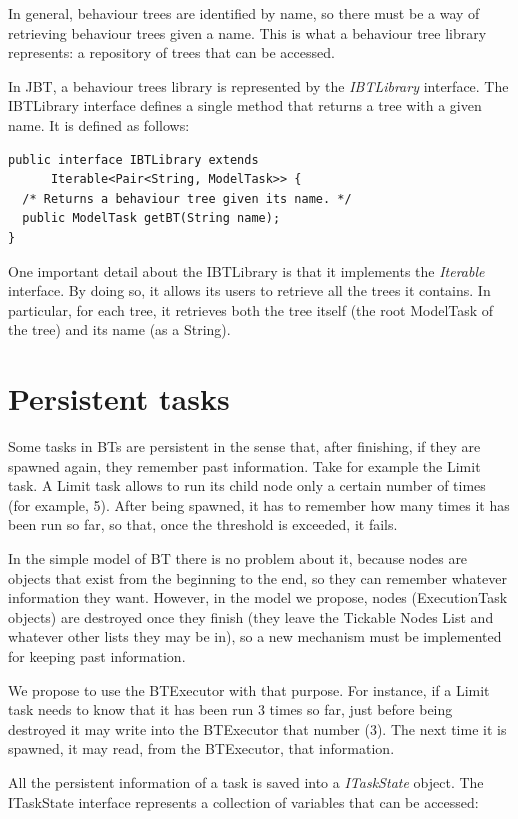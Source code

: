 \documentclass[a4paper,10pt]{article}
\begin{document}
In general, behaviour trees are identified by name, so there must be a way of retrieving behaviour trees given a name. This is what a behaviour tree library represents: a repository of trees that can be accessed.

In JBT, a behaviour trees library is represented by the \textit{IBTLibrary} interface. The IBTLibrary interface defines a single method that returns a tree with a given name. It is defined as follows:

\begin{verbatim}
public interface IBTLibrary extends 
	  Iterable<Pair<String, ModelTask>> {
  /* Returns a behaviour tree given its name. */
  public ModelTask getBT(String name);
}
\end{verbatim}

One important detail about the IBTLibrary is that it implements the \textit{Iterable} interface. By doing so, it allows its users to retrieve all the trees it contains. In particular, for each tree, it retrieves both the tree itself (the root ModelTask of the tree) and its name (as a String).

\section{Persistent tasks}

Some tasks in BTs are persistent in the sense that, after finishing, if they are spawned again, they remember past information. Take for example the Limit task. A Limit task allows to run its child node only a certain number of times (for example, 5). After being spawned, it has to remember how many times it has been run so far, so that, once the threshold is exceeded, it fails.

In the simple model of BT there is no problem about it, because nodes are objects that exist from the beginning to the end, so they can remember whatever information they want. However, in the model we propose, nodes (ExecutionTask objects) are destroyed once they finish (they leave the Tickable Nodes List and whatever other lists they may be in), so a new mechanism must be implemented for keeping past information.

We propose to use the BTExecutor with that purpose. For instance, if a Limit task needs to know that it has been run 3 times so far, just before being destroyed it may write into the BTExecutor that number (3). The next time it is spawned, it may read, from the BTExecutor, that information. 

All the persistent information of a task is saved into a \textit{ITaskState} object. The ITaskState interface represents a collection of variables that can be accessed:
\end{document}
